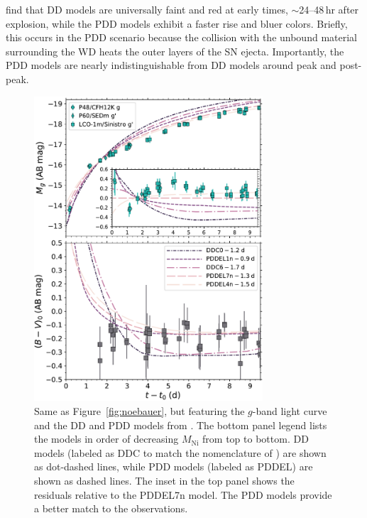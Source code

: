 \documentclass[twocolumn]{aastex61}
\begin{document}
\citet{2014MNRAS.441..532D} find that DD models are universally faint and
red at early times, $\sim$24--48\,hr after explosion, while the PDD models
exhibit a faster rise and bluer colors. Briefly, this occurs in the PDD
scenario because the collision with the unbound material surrounding the WD
heats the outer layers of the SN ejecta. Importantly, the PDD models are
nearly indistinguishable from DD models around peak and post-peak.

\begin{figure}[]
  \centering
  \includegraphics[width=3.35in]{compare_Dessart.pdf}
  \caption{
  Same as Figure~\ref{fig:noebauer}, but featuring the $g$-band light curve
  and the DD and PDD models from \citet{2014MNRAS.441..532D}. The bottom
  panel legend lists the models in order of decreasing $M_\mathrm{Ni}$ from
  top to bottom. DD models (labeled as DDC to match the nomenclature of
  \citealt{2014MNRAS.441..532D}) are shown as dot-dashed lines, while PDD
  models (labeled as PDDEL) are shown as dashed lines. The inset in the top
  panel shows the residuals relative to the PDDEL7n model. The PDD models
  provide a better match to the observations.}
  \label{fig:dessart} 
\end{figure}
\end{document}
